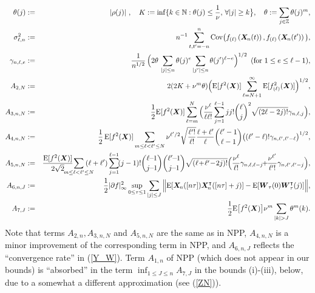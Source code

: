 \documentclass[10pt]{article}
\def\N{\mathbb{N}}
\def\Z{\mathbb{Z}}
\def\E{\mathrm E}
\newcommand{\mbf}[1]{\mbox{\boldmath $#1$}}
\newcommand{\Cov}{\mbox{Cov}}
\def\Cov{\mathrm{Cov}}
\begin{document}
\begin{eqnarray}
\theta(j)&:=& |\rho(j)|~,\quad
K:=\inf\{k\in \N: \theta(j) \leq \frac 1 \nu ,\, \forall |j|\geq k \big \},  \quad
\theta :=  \sum_{j\in \Z} \theta(j)^m, \\
\label{sigmam}\sigma_{\ell,n}^2&:=&n^{-1}\sum_{t, t'=-n}^n  \Cov\big (f_{(\ell)}\left({\mbf
X}_{\! n}(t) \right), f_{(\ell)}\left({\mbf
X}_{\! n}(t') \right) \big),  \\
\label{gamma}  \gamma_{n,\ell,e}&:=& \frac 1 {n^{1/2}} \, \Big (2\theta \,
 \sum_{|j|\leq n} \theta(j)^e \sum_{|j'|\leq n} \theta(j')^{\ell-e}\Big )^{1/2} \,\,\, (\mbox{for } 1\leq e\leq \ell-1), \\
\label{A2} A_{2,N}&:=& 2(2K+\nu^m \theta)
\Big (\E[f^2({\mbf X})]\sum_{\ell=N+1}^\infty \E[f^2_{(\ell)}({\mbf X})]\Big)^{1/2} ,\\
\label{A3}A_{3,n,N}&:=&\frac{1}{2} \E [f^2 ({\mbf X})] \sum_{\ell = m}^N
\Big( \frac{\nu^\ell}{ \ell \ell !} \sum_{j=1}^{\ell -1} j j! {\ell \choose j}^2 \sqrt{(2\ell - 2j)!} \gamma_{n,\ell, j} \Big), \\
\label{A4} A_{4,n,N}&:=&\frac1 2 \, \E[f^2({\mbf X})] %
\sum_{m\leq \ell <\ell'\leq N} \nu ^{{\ell'}/2}\sqrt{\frac{\ell'!}{\ell!}}
\frac{\ell +\ell'}{\ell}{\ell'-1 \choose \ell-1}\big ((\ell'-\ell)! \gamma_{n,\ell',\ell'-\ell}\big ) ^{1/2}, \\
 A_{5,n,N}&:=& \frac{\E[f^2({\mbf X})]}{2\sqrt{2}}\!\!\!\! \!\!\!\!\!  \sum_{m\leq \ell<\ell'\leq N}\!\!\!\!\!\!\!  (\ell +\ell')
\sum_{j=1}^{\ell-1} \!(j-1)!{\ell\!\!-\!\!1 \choose j\!\!-\!\! 1}{\ell'\!\!-\!\!1 \choose j\!\!-\!\!1}\sqrt{(\ell\!+\!\ell'\!-\!2j)!} \Big (\frac{\nu^\ell}{\ell!}
\gamma_{n,\ell,\ell-j}\!\!+\!\!\frac{\nu^{\ell'}}{\ell'!} \gamma_{n,\ell',\ell'-j}\Big), \label{A5}\\
A_{6,n,J}&:=&\frac 1 2 |\partial f|^2_\infty \sup_{0\le \tau \le 1} \sum_{|j| \le J} \Big\| \E [{\mbf
X}_{\! n}([n\tau]) {\mbf
X}^\intercal_{\! n}([n\tau] +j) ] - \E [ {\mbf W}_\tau(0) {\mbf W}^\intercal_\tau(j) ]\Big\|, \label{A6}\\
A_{7,J}&:=&\frac 1 2  \E \big [ f^2({\mbf X})\big ]  \nu^m  \sum_{|k|>J} \theta^m(k)   \label{A7}.
\end{eqnarray}
Note that terms $A_{2,n}, A_{3,n,N}$ and $A_{5,n,N}$ are the same as in NPP,
$A_{4,n,N}$ is a minor improvement of the corresponding term in NPP, and
$A_{6,n,J}$ reflects the ``convergence rate'' in (\ref{Y_W}). Term $A_{1,n} $ of NPP (which does not appear
in our bounds) is ``absorbed'' in the term $\inf_{1\le  J\le n} A_{7,J}$ in the bounds (i)-(iii), below,
due to a somewhat a different approximation (see (\ref{ZN})).
\end{document}
